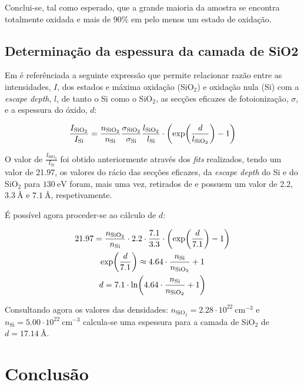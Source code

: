 \documentclass[baaa]{baaa}
\begin{document}
Conclui-se, tal como esperado, que a grande maioria da amostra se encontra totalmente oxidada e mais de $90\%$ em pelo menos um estado de oxidação.

\subsection{Determinação da espessura da camada de SiO2}

Em \cite{Himpsel} é referênciada a seguinte expressão que permite relacionar razão entre as intensidades, $I$, dos estados e máxima oxidação (SiO$_2$) e oxidação nula (Si) com a \textit{escape depth}, $l$, de tanto o Si como o SiO$_2$, as secções eficazes de fotoionização, $\sigma$, e a espessura do óxido, $d$:

\begin{gather}
  \frac{I_{\text{SiO}_2}}{I_{\text{Si}}}=\frac{n_{\text{SiO}_2}}{n_{\text{Si}}}\frac{\sigma_{\text{SiO}_2}}{\sigma_{\text{Si}}}\frac{l_{\text{SiO}_2}}{l_{\text{Si}}}\cdot \qty(\exp(\frac{d}{l_{\text{SiO}_2}})-1)
\end{gather}

O valor de $\frac{I_{\text{SiO}_2}}{I_{\text{Si}}}$ foi obtido anteriormente através dos \textit{fits} realizados, tendo um valor de 21.97, os valores do rácio das secções eficazes, da \textit{escape depth} do Si e do SiO$_2$ para $130\ \si{\electronvolt}$ foram, mais uma vez, retirados de \cite{Himpsel} e possuem um valor de 2.2, $3.3\ \si{\angstrom}$ e $7.1\ \si{\angstrom}$, respetivamente.

É possível agora proceder-se ao cálculo de $d$:

\begin{gather}
  21.97=\frac{n_{\text{SiO}_2}}{n_{\text{Si}}}\cdot 2.2\cdot\frac{7.1}{3.3}\cdot \qty(\exp(\frac{d}{7.1})-1)\\
  \exp(\frac{d}{7.1})\approx 4.64\cdot\frac{n_{\text{Si}}}{n_{\text{SiO}_2}}+1\\
  d=7.1\cdot\ln( 4.64\cdot\frac{n_{\text{Si}}}{n_{\text{SiO}_2}}+1)
\end{gather}

Consultando agora os valores das densidades\cite{Himpsel}: $n_{\text{SiO}_2}=2.28\cdot 10^{22}\ \si{\centi\meter^{-3}}$ e $n_{\text{Si}}=5.00\cdot 10^{22}\ \si{\centi\meter^{-3}}$ calcula-se uma espessura para a camada de SiO$_2$ de $d=17.14\ \si{\angstrom}$.



\section{Conclusão}
\end{document}
